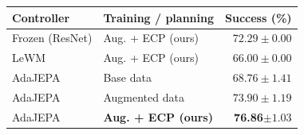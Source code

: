 \label{tab:eval-seeds}
\small
\begin{tabular*}{\columnwidth}{@{\extracolsep{\fill}}llr@{}}
\toprule
Controller & Training / planning & Success (\%)\\
\midrule
Frozen (ResNet) & Aug. + ECP (ours) & $72.29\pm0.00$\\
LeWM & Aug. + ECP (ours) & $66.00\pm0.00$\\
\midrule
AdaJEPA & Base data & $68.76\pm1.41$\\
AdaJEPA & Augmented data & $73.90\pm1.19$\\
AdaJEPA & \textbf{Aug. + ECP (ours)} & \textbf{76.86}$\pm1.03$\\
\bottomrule
\end{tabular*}
